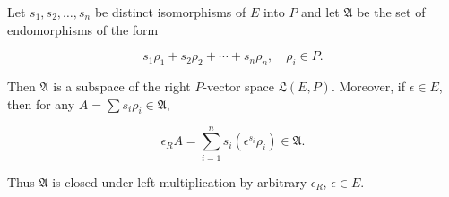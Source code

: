 Let $s_1, s_2, \dots, s_n$ be distinct isomorphisms of $E$ into $P$ and let $\mathfrak{A}$ be the set of endomorphisms of the form

$$s_1 \rho_1 + s_2 \rho_2 + \cdots + s_n \rho_n, \quad \rho_i \in P.$$

Then $\mathfrak{A}$ is a subspace of the right $P$-vector space $\mathfrak{L}(E, P)$. Moreover, if $\epsilon \in E$, then for any $A = \sum s_i \rho_i \in \mathfrak{A}$,

$$\epsilon_R A = \sum_{i=1}^{n} s_i (\epsilon^{s_i} \rho_i) \in \mathfrak{A}.$$

Thus $\mathfrak{A}$ is closed under left multiplication by arbitrary $\epsilon_R$, $\epsilon \in E$.
